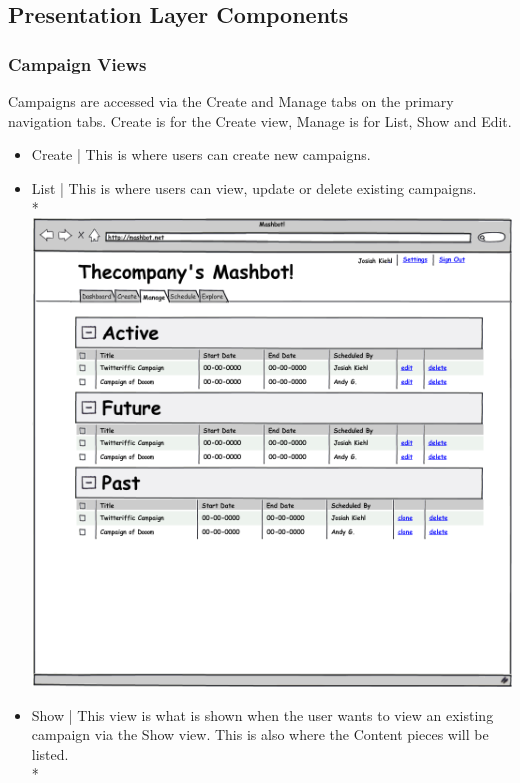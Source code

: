\documentclass{article}
\begin{document}
\subsection{Presentation Layer Components}
\subsubsection{Campaign Views}
Campaigns are accessed via the Create and Manage tabs on the primary navigation tabs.  Create is for the Create view, Manage is for List, Show and Edit.
\begin{itemize}
\item Create | This is where users can create new campaigns.
\item List | This is where users can view, update or delete existing campaigns. \\*
  \includegraphics[width=\textwidth]{../mockups/manage.png}
\item Show | This view is what is shown when the user wants to view an existing campaign via the Show view.  This is also where the Content pieces will be listed. \\*

\end{itemize}
\end{document}
